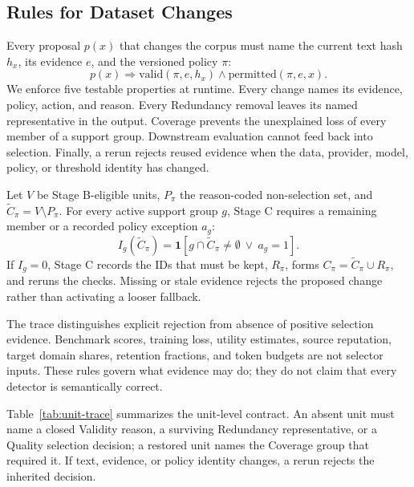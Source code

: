 \documentclass[conference]{IEEEtran}
\begin{document}
\subsection{Rules for Dataset Changes}
Every proposal $p(x)$ that changes the corpus must name the current text hash
$h_x$, its evidence $e$, and the versioned policy $\pi$:
\begin{equation}
p(x)\Rightarrow
\mathrm{valid}(\pi,e,h_x)\land\mathrm{permitted}(\pi,e,x).
\label{eq:authority}
\end{equation}
We enforce five testable properties at runtime. Every change names its evidence,
policy, action, and reason. Every Redundancy removal leaves its named
representative in the output. Coverage prevents the unexplained loss of every
member of a support group. Downstream evaluation cannot feed back into
selection. Finally, a rerun rejects reused evidence when the data, provider,
model, policy, or threshold identity has changed.

Let $V$ be Stage B-eligible units, $P_\pi$ the reason-coded non-selection set,
and $\widetilde C_\pi=V\setminus P_\pi$. For every active support group $g$, Stage C
requires a remaining member or a recorded policy exception $a_g$:
\begin{equation}
I_g(\widetilde C_\pi)=
\mathbf{1}[g\cap\widetilde C_\pi\neq\emptyset\ \lor\ a_g=1].
\label{eq:coverage}
\end{equation}
If $I_g=0$, Stage C records the IDs that must be kept, $R_\pi$, forms
$C_\pi=\widetilde C_\pi\cup R_\pi$, and reruns the checks. Missing or stale
evidence rejects the proposed change rather than activating a looser fallback.

The trace distinguishes explicit rejection from absence of positive selection
evidence. Benchmark scores, training loss, utility estimates, source
reputation, target domain shares, retention fractions, and token budgets are
not selector inputs. These rules govern what evidence may do; they do not
claim that every detector is semantically correct.

Table~\ref{tab:unit-trace} summarizes the unit-level contract. An absent unit
must name a closed Validity reason, a surviving Redundancy representative, or
a Quality selection decision; a restored unit names the Coverage group that
required it. If text, evidence, or policy identity changes, a rerun rejects the
inherited decision.
\end{document}

